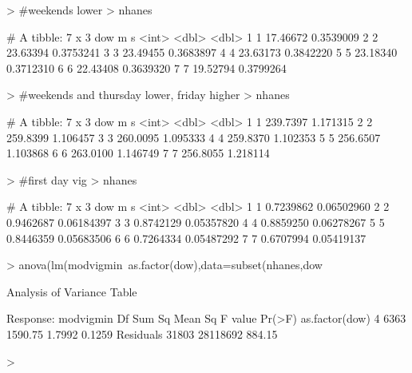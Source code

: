 \documentclass[11pt]{article}
\begin{document}
\begin{Schunk}
\begin{Sinput}
> #weekends lower
> nhanes %>% group_by(dow) %>% summarise(m=mean(modvigmin),s=sd(modvigmin)/sqrt(length(modvigmin)))
\end{Sinput}
\begin{Soutput}
# A tibble: 7 x 3
    dow        m         s
  <int>    <dbl>     <dbl>
1     1 17.46672 0.3539009
2     2 23.63394 0.3753241
3     3 23.49455 0.3683897
4     4 23.63173 0.3842220
5     5 23.18340 0.3712310
6     6 22.43408 0.3639320
7     7 19.52794 0.3799264
\end{Soutput}
\begin{Sinput}
> #weekends and thursday lower, friday higher
> nhanes %>% group_by(dow) %>% summarise(m=mean(lightmin),s=sd(lightmin)/sqrt(length(lightmin)))
\end{Sinput}
\begin{Soutput}
# A tibble: 7 x 3
    dow        m        s
  <int>    <dbl>    <dbl>
1     1 239.7397 1.171315
2     2 259.8399 1.106457
3     3 260.0095 1.095333
4     4 259.8370 1.102353
5     5 256.6507 1.103868
6     6 263.0100 1.146749
7     7 256.8055 1.218114
\end{Soutput}
\begin{Sinput}
> #first day vig
> nhanes %>% group_by(dow) %>% summarise(m=mean(vigmin),s=sd(vigmin)/sqrt(length(lightmin)))
\end{Sinput}
\begin{Soutput}
# A tibble: 7 x 3
    dow         m          s
  <int>     <dbl>      <dbl>
1     1 0.7239862 0.06502960
2     2 0.9462687 0.06184397
3     3 0.8742129 0.05357820
4     4 0.8859250 0.06278267
5     5 0.8446359 0.05683506
6     6 0.7264334 0.05487292
7     7 0.6707994 0.05419137
\end{Soutput}
\begin{Sinput}
> anova(lm(modvigmin~as.factor(dow),data=subset(nhanes,dow%in%c(2:6)))) #M-F similar
\end{Sinput}
\begin{Soutput}
Analysis of Variance Table

Response: modvigmin
                  Df   Sum Sq Mean Sq F value Pr(>F)
as.factor(dow)     4     6363 1590.75  1.7992 0.1259
Residuals      31803 28118692  884.15               
\end{Soutput}
\begin{Sinput}
> 
\end{Sinput}
\end{Schunk}
\end{document}
